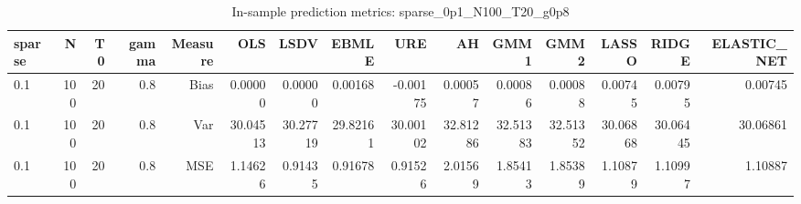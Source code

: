 \begin{table}[!htbp]\centering
\caption{In-sample prediction metrics: sparse_0p1_N100_T20_g0p8}
\label{tab:table2_sparse_0p1_N100_T20_g0p8}
\begin{tabular}{lrrrrrrrrrrrrrr}
\hline
sparse & N & T0 & gamma & Measure & OLS & LSDV & EBMLE & URE & AH & GMM1 & GMM2 & LASSO & RIDGE & ELASTIC_NET \\
\hline
0.1 & 100 & 20 & 0.8 & Bias & 0.00000 & 0.00000 & 0.00168 & -0.00175 & 0.00057 & 0.00086 & 0.00088 & 0.00745 & 0.00795 & 0.00745 \\
0.1 & 100 & 20 & 0.8 & Var & 30.04513 & 30.27719 & 29.82161 & 30.00102 & 32.81286 & 32.51383 & 32.51352 & 30.06868 & 30.06445 & 30.06861 \\
0.1 & 100 & 20 & 0.8 & MSE & 1.14626 & 0.91435 & 0.91678 & 0.91526 & 2.01569 & 1.85413 & 1.85389 & 1.10879 & 1.10997 & 1.10887 \\
\hline
\end{tabular}
\end{table}

